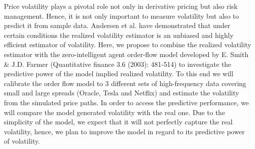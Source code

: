 Price volatility plays a pivotal role not only in derivative pricing but also risk management. Hence, it is not only important to measure volatility but also to predict it from sample data. Andersen et al. have demonstrated that under certain conditions the realized volatility estimator is an unbiased and highly efficient estimator of volatility. Here, we propose to combine the realized volatility estimator with the zero-intelligent agent order-flow model developed by E. Smith \& J.D. Farmer (Quantitative finance 3.6 (2003): 481-514) to investigate the predictive power of the model implied realized volatility. To this end we will calibrate the order flow model to $3$ different sets of high-frequency data covering small and large spreads (Oracle, Tesla and Netflix) and estimate the volatility from the simulated price paths. In order to access the predictive performance, we will compare the  model generated volatility with the real one. Due to the simplicity of the model, we expect that it will not perfectly capture the real volatility, hence, we plan to improve the model in regard to its predictive power of volatility.
